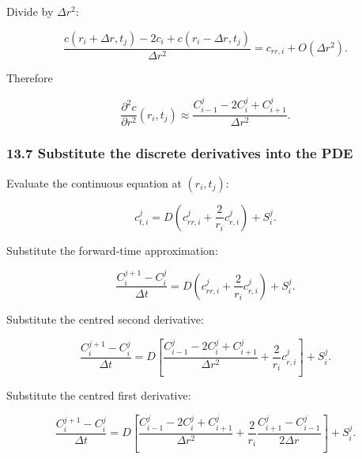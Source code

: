 \documentclass[11pt,a4paper]{article}
\begin{document}
Divide by $\Delta r^2$:

\begin{equation}
\frac{
c(r_i+\Delta r,t_j)-2c_i+c(r_i-\Delta r,t_j)
}{
\Delta r^2
}
=
c_{rr,i}
+
O(\Delta r^2).
\tag{TRISO-DIS-124}
\label{eq:triso-dis-124}
\end{equation}

Therefore

\begin{equation}
\boxed{
\frac{\partial^2c}{\partial r^2}(r_i,t_j)
\approx
\frac{
C_{i-1}^j-2C_i^j+C_{i+1}^j
}{
\Delta r^2
}.
}
\tag{TRISO-DIS-125}
\label{eq:triso-dis-125}
\end{equation}

\subsubsection*{13.7 Substitute the discrete derivatives into the PDE}

Evaluate the continuous equation at $(r_i,t_j)$:

\begin{equation}
c_{t,i}^j
=
D
\left(
c_{rr,i}^j
+
\frac2{r_i}c_{r,i}^j
\right)
+
S_i^j.
\tag{TRISO-DIS-126}
\label{eq:triso-dis-126}
\end{equation}

Substitute the forward-time approximation:

\begin{equation}
\frac{
C_i^{j+1}-C_i^j
}{
\Delta t
}
=
D
\left(
c_{rr,i}^j
+
\frac2{r_i}c_{r,i}^j
\right)
+
S_i^j.
\tag{TRISO-DIS-127}
\label{eq:triso-dis-127}
\end{equation}

Substitute the centred second derivative:

\begin{equation}
\frac{
C_i^{j+1}-C_i^j
}{
\Delta t
}
=
D
\left[
\frac{
C_{i-1}^j-2C_i^j+C_{i+1}^j
}{
\Delta r^2
}
+
\frac2{r_i}c_{r,i}^j
\right]
+
S_i^j.
\tag{TRISO-DIS-128}
\label{eq:triso-dis-128}
\end{equation}

Substitute the centred first derivative:

\begin{equation}
\frac{
C_i^{j+1}-C_i^j
}{
\Delta t
}
=
D
\left[
\frac{
C_{i-1}^j-2C_i^j+C_{i+1}^j
}{
\Delta r^2
}
+
\frac2{r_i}
\frac{
C_{i+1}^j-C_{i-1}^j
}{
2\Delta r
}
\right]
+
S_i^j.
\tag{TRISO-DIS-129}
\label{eq:triso-dis-129}
\end{equation}
\end{document}
